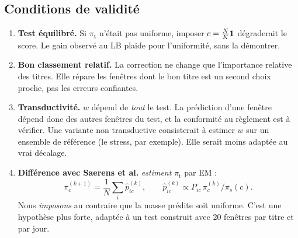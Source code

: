 \subsection{Conditions de validité}
\begin{enumerate}
\item \textbf{Test équilibré.} Si $\pi_{\mathrm{t}}$ n'était pas uniforme, imposer $c=\frac NK\mathbf{1}$ dégraderait le score. Le gain observé au LB plaide pour l'uniformité, sans la démontrer.
\item \textbf{Bon classement relatif.} La correction ne change que l'importance relative des titres. Elle répare les fenêtres dont le bon titre est un second choix proche, pas les erreurs confiantes.
\item \textbf{Transductivité.} $w$ dépend de \emph{tout} le test. La prédiction d'une fenêtre dépend donc des autres fenêtres du test, et la conformité au règlement est à vérifier. Une variante non transductive consisterait à estimer $w$ sur un ensemble de référence (le stress, par exemple). Elle serait moins adaptée au vrai décalage.
\item \textbf{Différence avec Saerens et al.} \cite{saerens} \emph{estiment} $\pi_{\mathrm{t}}$ par EM :
\begin{equation}
\pi^{(k+1)}_c=\frac1N\sum_i\hat p^{(k)}_{ic},\qquad \hat p^{(k)}_{ic}\propto P_{ic}\,\pi^{(k)}_c/\pi_s(c).
\end{equation}
Nous \emph{imposons} au contraire que la masse prédite soit uniforme. C'est une hypothèse plus forte, adaptée à un test construit avec 20 fenêtres par titre et par jour.
\end{enumerate}
